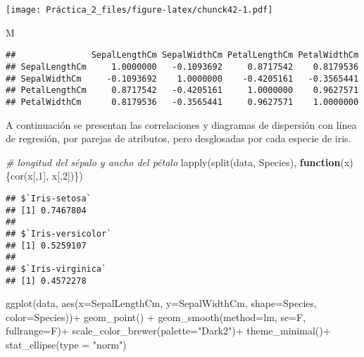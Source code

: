\documentclass[
]{article}
\newenvironment{Shaded}{\begin{snugshade}}{\end{snugshade}}
\newcommand{\AttributeTok}[1]{\textcolor[rgb]{0.77,0.63,0.00}{#1}}
\newcommand{\CommentTok}[1]{\textcolor[rgb]{0.56,0.35,0.01}{\textit{#1}}}
\newcommand{\ControlFlowTok}[1]{\textcolor[rgb]{0.13,0.29,0.53}{\textbf{#1}}}
\newcommand{\DecValTok}[1]{\textcolor[rgb]{0.00,0.00,0.81}{#1}}
\newcommand{\FunctionTok}[1]{\textcolor[rgb]{0.00,0.00,0.00}{#1}}
\newcommand{\NormalTok}[1]{#1}
\newcommand{\SpecialCharTok}[1]{\textcolor[rgb]{0.00,0.00,0.00}{#1}}
\newcommand{\StringTok}[1]{\textcolor[rgb]{0.31,0.60,0.02}{#1}}
\begin{document}
\texttt{[image: Práctica\_2\_files/figure-latex/chunck42-1.pdf]}

\begin{Shaded}
\begin{Highlighting}[]
\NormalTok{M}
\end{Highlighting}
\end{Shaded}

\begin{verbatim}
##               SepalLengthCm SepalWidthCm PetalLengthCm PetalWidthCm
## SepalLengthCm     1.0000000   -0.1093692     0.8717542    0.8179536
## SepalWidthCm     -0.1093692    1.0000000    -0.4205161   -0.3565441
## PetalLengthCm     0.8717542   -0.4205161     1.0000000    0.9627571
## PetalWidthCm      0.8179536   -0.3565441     0.9627571    1.0000000
\end{verbatim}

A continuación se presentan las correlaciones y diagramas de dispersión
con línea de regresión, por parejas de atributos, pero desglosadas por
cada especie de iris.

\begin{Shaded}
\begin{Highlighting}[]
\CommentTok{\# longitud del sépalo y ancho del pétalo}
\FunctionTok{lapply}\NormalTok{(}\FunctionTok{split}\NormalTok{(data, Species), }\ControlFlowTok{function}\NormalTok{(x)\{}\FunctionTok{cor}\NormalTok{(x[,}\DecValTok{1}\NormalTok{], x[,}\DecValTok{2}\NormalTok{])\})}
\end{Highlighting}
\end{Shaded}

\begin{verbatim}
## $`Iris-setosa`
## [1] 0.7467804
## 
## $`Iris-versicolor`
## [1] 0.5259107
## 
## $`Iris-virginica`
## [1] 0.4572278
\end{verbatim}

\begin{Shaded}
\begin{Highlighting}[]
\FunctionTok{ggplot}\NormalTok{(data, }\FunctionTok{aes}\NormalTok{(}\AttributeTok{x=}\NormalTok{SepalLengthCm, }\AttributeTok{y=}\NormalTok{SepalWidthCm, }\AttributeTok{shape=}\NormalTok{Species, }\AttributeTok{color=}\NormalTok{Species))}\SpecialCharTok{+}
\FunctionTok{geom\_point}\NormalTok{() }\SpecialCharTok{+}
\FunctionTok{geom\_smooth}\NormalTok{(}\AttributeTok{method=}\NormalTok{lm, }\AttributeTok{se=}\NormalTok{F, }\AttributeTok{fullrange=}\NormalTok{F)}\SpecialCharTok{+}
\FunctionTok{scale\_color\_brewer}\NormalTok{(}\AttributeTok{palette=}\StringTok{"Dark2"}\NormalTok{)}\SpecialCharTok{+}
\FunctionTok{theme\_minimal}\NormalTok{()}\SpecialCharTok{+}
\FunctionTok{stat\_ellipse}\NormalTok{(}\AttributeTok{type =} \StringTok{"norm"}\NormalTok{)}
\end{Highlighting}
\end{Shaded}
\end{document}
